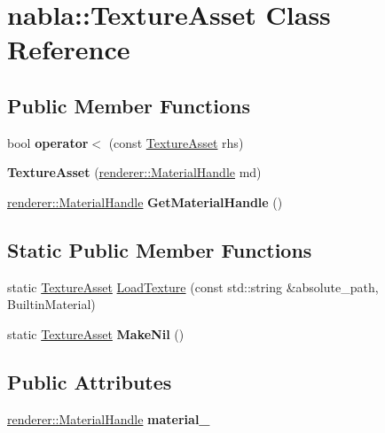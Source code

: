 \hypertarget{classnabla_1_1_texture_asset}{}\section{nabla\+::Texture\+Asset Class Reference}
\label{classnabla_1_1_texture_asset}
\subsection*{Public Member Functions}
\begin{DoxyCompactItemize}
\item 
\mbox{\label{classnabla_1_1_texture_asset_ad526f479a4212dfa3894d17ace25a16a}} 
bool {\bfseries operator$<$} (const \mbox{\hyperlink{classnabla_1_1_texture_asset}{Texture\+Asset}} rhs)
\item 
\mbox{\label{classnabla_1_1_texture_asset_aee509994777792be7a8753f8d3a7be89}} 
{\bfseries Texture\+Asset} (\mbox{\hyperlink{classnabla_1_1renderer_1_1_handle}{renderer\+::\+Material\+Handle}} md)
\item 
\mbox{\label{classnabla_1_1_texture_asset_a6581003471b3fba62d2f3910cb9c5e82}} 
\mbox{\hyperlink{classnabla_1_1renderer_1_1_handle}{renderer\+::\+Material\+Handle}} {\bfseries Get\+Material\+Handle} ()
\end{DoxyCompactItemize}
\subsection*{Static Public Member Functions}
\begin{DoxyCompactItemize}
\item 
static \mbox{\hyperlink{classnabla_1_1_texture_asset}{Texture\+Asset}} \mbox{\hyperlink{classnabla_1_1_texture_asset_af2ec4cc489f85367b405ede152a63646}{Load\+Texture}} (const std\+::string \&absolute\+\_\+path, Builtin\+Material)
\item 
\mbox{\label{classnabla_1_1_texture_asset_ad3e13ff81771815df0927046aff4f2a7}} 
static \mbox{\hyperlink{classnabla_1_1_texture_asset}{Texture\+Asset}} {\bfseries Make\+Nil} ()
\end{DoxyCompactItemize}
\subsection*{Public Attributes}
\begin{DoxyCompactItemize}
\item 
\mbox{\label{classnabla_1_1_texture_asset_a9dbb8433cbc92855f42a2e4dee06df88}} 
\mbox{\hyperlink{classnabla_1_1renderer_1_1_handle}{renderer\+::\+Material\+Handle}} {\bfseries material\+\_\+}
\end{DoxyCompactItemize}


